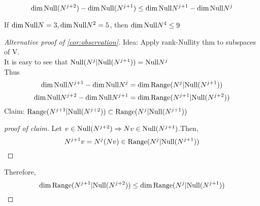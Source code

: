 \documentclass{aq-notes}
\newcommand{\Range}{\mbox{\normalfont Range}}
\newcommand{\Null}{\mbox{\normalfont Null}}
\begin{document}
\begin{corollary}\label{cor:observation}
    \[\dim\Null(N^{{j+2}}) - \dim\Null (N^{j+1})\leq \dim \Null N^{j+1}-\dim\Null N^j\]
\end{corollary}
\begin{example}
    If $\dim\Null N = 3,\dim \Null N^2 = 5$, then $\dim\Null N^4 \leq 9$
\end{example}


\begin{proof}[Alternative proof of \ref{cor:observation}]
    Idea: Apply rank-Nullity thm to subspaces of V.\\    
    It is easy to see that $\Null(N^j\vert {\Null(N^{j+1})}) =\Null N^j$\\
    Thus \[\dim\Null N^{j+1} - \dim\Null N^j = \dim \Range(N^j\vert {\Null(N^{j+1})})\]
    \[\dim\Null N^{j+2} - \dim\Null N^{j+1} = \dim \Range(N^{j+1}\vert {\Null(N^{j+2})})\]
    Claim: $\Range(N^{j+1}\vert {\Null(N^{j+2})})\subset \Range(N^j\vert {\Null(N^{j+1})})$
\begin{proof}[proof of claim]
        Let $v\in \Null(N^{j+2}) \Rightarrow Nv\in \Null(N^{j+1})$.Then, 
        \[N^{j+1}v = N^j(Nv)\in \Range(N^j\vert {\Null(N^{j+1})})\]
\end{proof}Therefore,
\[\dim \Range(N^{j+1}\vert {\Null(N^{j+2})})\leq \dim\Range(N^j\vert {\Null(N^{j+1})})\]
\end{proof}
\end{document}
